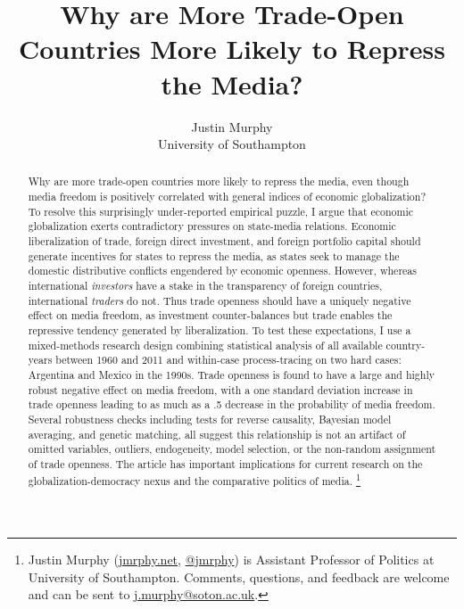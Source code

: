 \documentclass[12pt,a4paper]{article}\usepackage[]{graphicx}\usepackage[]{color}
\begin{document}
\title{Why are More Trade-Open Countries More Likely to Repress the Media?}

\author{Justin Murphy\\
University of Southampton}

\maketitle

\begin{singlespace}
\begin{abstract}
Why are more trade-open countries more likely to repress the media, even though media freedom is positively correlated with general indices of economic globalization? To resolve this surprisingly under-reported empirical puzzle, I argue that economic globalization exerts contradictory pressures on state-media relations. Economic liberalization of trade, foreign direct investment, and foreign portfolio capital should generate incentives for states to repress the media, as states seek to manage the domestic distributive conflicts engendered by economic openness. However, whereas international \emph{investors} have a stake in the transparency of foreign countries, international \emph{traders} do not. Thus trade openness should have a uniquely negative effect on media freedom, as investment counter-balances but trade enables the repressive tendency generated by liberalization. To test these expectations, I use a mixed-methods research design combining statistical analysis of all available country-years between 1960 and 2011 and within-case process-tracing on two hard cases: Argentina and Mexico in the 1990s. Trade openness is found to have a large and highly robust negative effect on media freedom, with a one standard deviation increase in trade openness leading to as much as a .5 decrease in the probability of media freedom. Several robustness checks including tests for reverse causality, Bayesian model averaging, and genetic matching, all suggest this relationship is not an artifact of omitted variables, outliers, endogeneity, model selection, or the non-random assignment of trade openness. The article has important implications for current research on the globalization-democracy nexus and the comparative politics of media. \footnote{Justin Murphy (\href{http://jmrphy.net}{jmrphy.net}, \href{http://twitter.com/jmrphy}{@jmrphy}) is Assistant Professor of Politics at University of Southampton. Comments, questions, and feedback are welcome and can be sent to \href{mailto:j.murphy@soton.ac.uk}{j.murphy@soton.ac.uk}.}

\end{abstract}
\end{singlespace}
\end{document}
